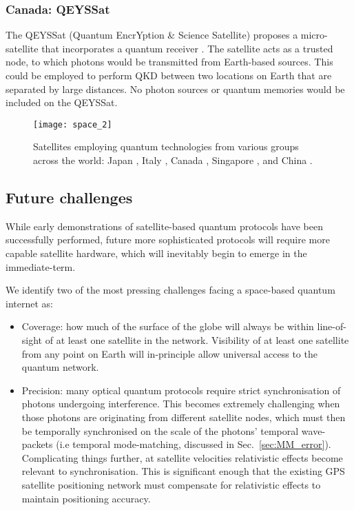 %
%

\subsubsection{Canada: QEYSSat}

The QEYSSat (Quantum EncrYption \& Science Satellite) proposes a micro-satellite that incorporates a quantum receiver \cite{bib:jennewein2014qeyssat}. The satellite acts as a trusted node, to which photons would be transmitted from Earth-based sources. This could be employed to perform QKD between two locations on Earth that are separated by large distances. No photon sources or quantum memories would be included on the QEYSSat. 

\begin{figure*}[!htb]
\texttt{[image: space\_2]}
\caption{Satellites employing quantum technologies from various groups across the world: Japan \cite{bib:horiuchi2015view}, Italy \cite{bib:vallone15}, Canada \cite{bib:jennewein2014qeyssat}, Singapore \cite{bib:tang2016generation}, and China \cite{bib:gibney16}.}
\label{fig:space_2}
\end{figure*}

%
%

\subsection{Future challenges}

While early demonstrations of satellite-based quantum protocols have been successfully performed, future more sophisticated protocols will require more capable satellite hardware, which will inevitably begin to emerge in the immediate-term.

We identify two of the most pressing challenges facing a space-based quantum internet as:
\begin{itemize}
\item Coverage: how much of the surface of the globe will always be within line-of-sight of at least one satellite in the network. Visibility of at least one satellite from any point on Earth will in-principle allow universal access to the quantum network.
\item Precision: many optical quantum protocols require strict synchronisation of photons undergoing interference. This becomes extremely challenging when those photons are originating from different satellite nodes, which must then be temporally synchronised on the scale of the photons' temporal wave-packets (i.e temporal mode-matching, discussed in Sec.~\ref{sec:MM_error}). Complicating things further, at satellite velocities relativistic effects become relevant to synchronisation. This is significant enough that the existing GPS satellite positioning network must compensate for relativistic effects to maintain positioning accuracy.
\end{itemize}

